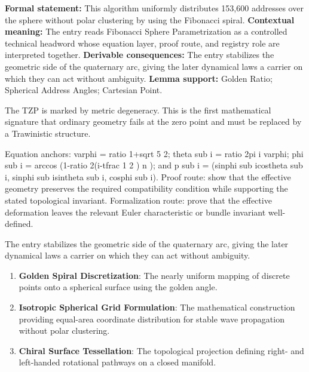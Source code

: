 \begingroup\footnotesize\setlength{\emergencystretch}{3em}\sloppy
\textbf{Formal statement:} This algorithm uniformly distributes 153,600 addresses over the sphere without polar clustering by using the Fibonacci spiral. \textbf{Contextual meaning:} The entry reads Fibonacci Sphere Parametrization as a controlled technical headword whose equation layer, proof route, and registry role are interpreted together. \textbf{Derivable consequences:} The entry stabilizes the geometric side of the quaternary arc, giving the later dynamical laws a carrier on which they can act without ambiguity. \textbf{Lemma support:} Golden Ratio; Spherical Address Angles; Cartesian Point.\par
\endgroup

The TZP is marked by metric degeneracy. This is the first mathematical signature that ordinary geometry fails at the zero point and must be replaced by a Trawinistic structure.

Equation anchors: varphi = ratio 1+sqrt 5 2; theta sub i = ratio 2pi i varphi; phi sub i = arccos (1-ratio 2(i-tfrac 1 2 ) n ); and p sub i = (sinphi sub icostheta sub i, sinphi sub isintheta sub i, cosphi sub i). Proof route: show that the effective geometry preserves the required compatibility condition while supporting the stated topological invariant. Formalization route: prove that the effective deformation leaves the relevant Euler characteristic or bundle invariant well-defined.

The entry stabilizes the geometric side of the quaternary arc, giving the later dynamical laws a carrier on which they can act without ambiguity.
\endgroup

\begin{enumerate}[leftmargin=1.6em,itemsep=6pt,topsep=4pt]
\item \textbf{Golden Spiral Discretization}: The nearly uniform mapping of discrete points onto a spherical surface using the golden angle.
\item \textbf{Isotropic Spherical Grid Formulation}: The mathematical construction providing equal-area coordinate distribution for stable wave propagation without polar clustering.
\item \textbf{Chiral Surface Tessellation}: The topological projection defining right- and left-handed rotational pathways on a closed manifold.
\end{enumerate}

